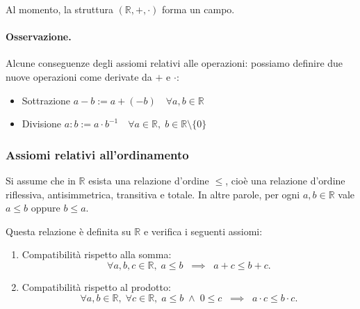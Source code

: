 Al momento, la struttura $(\mathbb{R}, +, \cdot)$ forma un campo.

\paragraph{Osservazione.}
Alcune conseguenze degli assiomi relativi alle operazioni:
possiamo definire due nuove operazioni come derivate da $+$ e $\cdot$:

\begin{itemize}
\item Sottrazione \quad $a - b := a + (-b) \quad \forall a, b \in \mathbb{R}$
\item Divisione \quad $a : b := a \cdot b^{-1} \quad \forall a \in \mathbb{R}, \; b \in \mathbb{R}\setminus \{0\}$
\end{itemize}



\subsubsection{Assiomi relativi all'ordinamento}
Si assume che in $\mathbb{R}$ esista una relazione d’ordine $\leq$, cioè una relazione d’ordine riflessiva, antisimmetrica, transitiva e totale.
In altre parole, per ogni $a,b \in \mathbb{R}$ vale $a \leq b$ oppure $b \leq a$.

Questa relazione è definita su $\mathbb{R}$ e verifica i seguenti assiomi:

\begin{enumerate}
  \renewcommand{\labelenumi}{b\theenumi}

  \item Compatibilità rispetto alla somma:
  \[
    \forall a,b,c \in \mathbb{R}, \; a \leq b \;\;\implies\;\; a+c \leq b+c.
  \]

  \item Compatibilità rispetto al prodotto:
  \[
    \forall a,b \in \mathbb{R}, \; \forall c \in \mathbb{R}, \;
    a \leq b \;\wedge\; 0 \leq c \;\;\implies\;\; a \cdot c \leq b \cdot c.
  \]
\end{enumerate}

